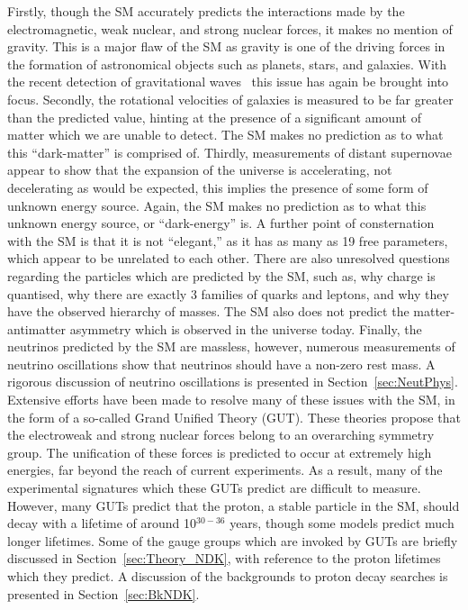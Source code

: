 Firstly, though the SM accurately predicts the interactions made by the electromagnetic, weak nuclear, and strong nuclear forces, it makes no mention of gravity. This is a major flaw of the SM as gravity is one of the driving forces in the formation of astronomical objects such as planets, stars, and galaxies. With the recent detection of gravitational waves~\citep{LIGO} this issue has again be brought into focus. Secondly, the rotational velocities of galaxies is measured to be far greater than the predicted value, hinting at the presence of a significant amount of matter which we are unable to detect. The SM makes no prediction as to what this ``dark-matter'' is comprised of. Thirdly, measurements of distant supernovae appear to show that the expansion of the universe is accelerating, not decelerating as would be expected, this implies the presence of some form of unknown energy source. Again, the SM makes no prediction as to what this unknown energy source, or ``dark-energy'' is. A further point of consternation with the SM is that it is not ``elegant,'' as it has as many as 19 free parameters, which appear to be unrelated to each other. There are also unresolved questions regarding the particles which are predicted by the SM, such as, why charge is quantised, why there are exactly 3 families of quarks and leptons, and why they have the observed hierarchy of masses. The SM also does not predict the matter-antimatter asymmetry which is observed in the universe today. Finally, the neutrinos predicted by the SM are massless, however, numerous measurements of neutrino oscillations show that neutrinos should have a non-zero rest mass. A rigorous discussion of neutrino oscillations is presented in Section~\ref{sec:NeutPhys}. \\

Extensive efforts have been made to resolve many of these issues with the SM, in the form of a so-called Grand Unified Theory (GUT). These theories propose that the electroweak and strong nuclear forces belong to an overarching symmetry group. The unification of these forces is predicted to occur at extremely high energies, far beyond the reach of current experiments. As a result, many of the experimental signatures which these GUTs predict are difficult to measure. However, many GUTs predict that the proton, a stable particle in the SM, should decay with a lifetime of around 10$^{30-36}$ years, though some models predict much longer lifetimes. Some of the gauge groups which are invoked by GUTs are briefly discussed in Section~\ref{sec:Theory_NDK}, with reference to the proton lifetimes which they predict. A discussion of the backgrounds to proton decay searches is presented in Section~\ref{sec:BkNDK}. \\

